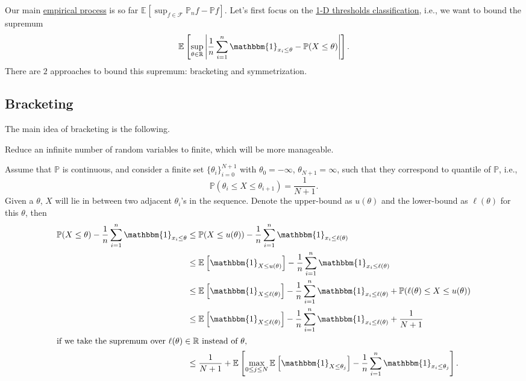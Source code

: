 Our main \hyperref[def:EP]{empirical process} is so far \(\mathbb{E}_{}\left[\sup _{f\in \mathscr{F} } \mathbb{P} _n f - \mathbb{P} f \right]\). Let's first focus on the \hyperref[eg:1D-classification-thresholds]{1-D thresholds classification}, i.e., we want to bound the supremum
\[
	\mathbb{E}_{}\left[\sup _{\theta \in \mathbb{R} } \left\vert \frac{1}{n} \sum_{i=1}^{n} \mathbbm{1}_{x_i \leq \theta } - \mathbb{P} (X \leq \theta ) \right\vert \right] .
\]
There are \(2\) approaches to bound this supremum: bracketing and symmetrization.

\subsection{Bracketing}
The main idea of bracketing is the following.

\begin{intuition}
	Reduce an infinite number of random variables to finite, which will be more manageable.
\end{intuition}

Assume that \(\mathbb{P} \) is continuous, and consider a finite set \(\{ \theta _i \}_{i = 0}^{N+1} \) with \(\theta _0 = -\infty \), \(\theta _{N+1} = \infty \), such that they correspond to quantile of \(\mathbb{P} \), i.e.,
\[
	\mathbb{P} (\theta _i \leq X \leq \theta _{i+1}) = \frac{1}{N+1}.
\]
Given a \(\theta \), \(X\) will lie in between two adjacent \(\theta _i\)'s in the sequence. Denote the upper-bound as \(u(\theta )\) and the lower-bound as \(\ell (\theta )\) for this \(\theta \), then
\begin{align}
	\mathbb{P} (X \leq \theta ) - \frac{1}{n} \sum_{i=1}^{n} \mathbbm{1}_{x_i \leq \theta }
	 & \leq \mathbb{P} (X \leq u(\theta )) - \frac{1}{n}\sum_{i=1}^{n} \mathbbm{1}_{x_i \leq \ell (\theta )}                                                                                           \nonumber            \\
	 & \leq \mathbb{E}_{}\left[\mathbbm{1}_{X \leq u(\theta )}  \right] - \frac{1}{n}\sum_{i=1}^{n} \mathbbm{1}_{x_i \leq \ell (\theta )}                                                              \nonumber            \\
	 & \leq \mathbb{E}_{}\left[\mathbbm{1}_{X \leq \ell (\theta )}  \right] - \frac{1}{n}\sum_{i=1}^{n} \mathbbm{1}_{x_i \leq \ell (\theta )} + \mathbb{P} (\ell (\theta ) \leq X \leq u(\theta ))     \nonumber            \\
	 & \leq \mathbb{E}_{}\left[\mathbbm{1}_{X \leq \ell (\theta )}  \right] - \frac{1}{n}\sum_{i=1}^{n} \mathbbm{1}_{x_i \leq \ell (\theta )} + \frac{1}{N+1}                                          \nonumber            \\
	\shortintertext{if we take the supremum over \(\ell (\theta) \in \mathbb{R} \) instead of \(\theta \),}
	 & \leq \frac{1}{N+1} + \mathbb{E}_{}\left[\max _{0 \leq j \leq N} \mathbb{E}_{}\left[\mathbbm{1}_{X \leq \theta _j}\right] - \frac{1}{n} \sum_{i=1}^{n} \mathbbm{1}_{x_i \leq \theta _j} \right].\label{eq:bracketing}
\end{align}


